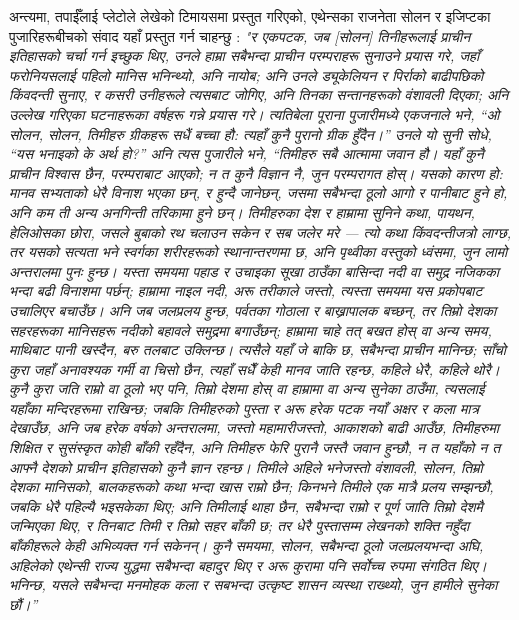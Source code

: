 \documentclass[10pt,twocolumn,letterpaper]{article}
\begin{document}
अन्त्यमा, तपाईँलाई प्लेटोले लेखेको टिमायसमा प्रस्तुत गरिएको, एथेन्सका राजनेता सोलन र इजिप्टका पुजारिहरूबीचको संवाद यहाँ प्रस्तुत गर्न चाहन्छु \cite{140}: \textit{"र एकपटक, जब [सोलन] तिनीहरूलाई प्राचीन इतिहासको चर्चा गर्न इच्छुक थिए, उनले हाम्रा सबैभन्दा प्राचीन परम्पराहरू सुनाउने प्रयास गरे, जहाँ फरोनियसलाई पहिलो मानिस भनिन्थ्यो, अनि नायोब; अनि उनले ड्यूकेलियन र पिर्राको बाढीपछिको किंवदन्ती सुनाए, र कसरी उनीहरूले त्यसबाट जोगिए, अनि तिनका सन्तानहरूको वंशावली दिएका; अनि उल्लेख गरिएका घटनाहरूका वर्षहरू गन्ने प्रयास गरे। त्यतिबेला पूराना पुजारीमध्ये एकजनाले भने, “ओ सोलन, सोलन, तिमीहरु ग्रीकहरू सधैं बच्चा हौ: त्यहाँ कुनै पुरानो ग्रीक हुँदैन।” उनले यो सुनी सोधे, “यस भनाइको के अर्थ हो?” अनि त्यस पुजारीले भने, “तिमीहरु सबै आत्मामा जवान हौ। यहाँ कुनै प्राचीन विश्वास छैन, परम्पराबाट आएको; न त कुनै विज्ञान नै, जुन परम्परागत होस्। यसको कारण हो: मानव सभ्यताको धेरै विनाश भएका छन्, र हुन्दै जानेछन्, जसमा सबैभन्दा ठूलो आगो र पानीबाट हुने हो, अनि कम ती अन्य अनगिन्ती तरिकामा हुने छन्। तिमीहरुका देश र हाम्रामा सुनिने कथा, पायथन, हेलिओसका छोरा, जसले बुबाको रथ चलाउन सकेन र सब जलेर मरे — त्यो कथा किंवदन्तीजत्रो लाग्छ, तर यसको सत्यता भने स्वर्गका शरीरहरूको स्थानान्तरणमा छ, अनि पृथ्वीका वस्तुको ध्वंसमा, जुन लामो अन्तरालमा पुनः हुन्छ। यस्ता समयमा पहाड र उचाइका सूखा ठाउँका बासिन्दा नदी वा समुद्र नजिकका भन्दा बढी विनाशमा पर्छन्; हाम्रामा नाइल नदी, अरू तरीकाले जस्तो, त्यस्ता समयमा यस प्रकोपबाट उचालिएर बचाउँछ। अनि जब जलप्रलय हुन्छ, पर्वतका गोठाला र बाख्रापालक बच्छन्, तर तिम्रो देशका सहरहरूका मानिसहरू नदीको बहावले समुद्रमा बगाउँछन्; हाम्रामा चाहे तत् बखत होस् वा अन्य समय, माथिबाट पानी खस्दैन, बरु तलबाट उक्लिन्छ। त्यसैले यहाँ जे बाकि छ, सबैभन्दा प्राचीन मानिन्छ; साँचो कुरा जहाँ अनावश्यक गर्मी वा चिसो छैन, त्यहाँ सधैँ केही मानव जाति रहन्छ, कहिले धेरै, कहिले थोरै। कुनै कुरा जति राम्रो वा ठूलो भए पनि, तिम्रो देशमा होस् वा हाम्रामा वा अन्य सुनेका ठाउँमा, त्यसलाई यहाँका मन्दिरहरूमा राखिन्छ; जबकि तिमीहरुको पुस्ता र अरू हरेक पटक नयाँ अक्षर र कला मात्र देखाउँछ, अनि जब हरेक वर्षको अन्तरालमा, जस्तो महामारीजस्तो, आकाशको बाढी आउँछ, तिमीहरुमा शिक्षित र सुसंस्कृत कोही बाँकी रहँदैन, अनि तिमीहरु फेरि पुरानै जस्तै जवान हुन्छौ, न त यहाँको न त आफ्नै देशको प्राचीन इतिहासको कुनै ज्ञान रहन्छ। तिमीले अहिले भनेजस्तो वंशावली, सोलन, तिम्रो देशका मानिसको, बालकहरूको कथा भन्दा खास राम्रो छैन; किनभने तिमीले एक मात्रै प्रलय सम्झन्छौ, जबकि धेरै पहिल्यै भइसकेका थिए; अनि तिमीलाई थाहा छैन, सबैभन्दा राम्रो र पूर्ण जाति तिम्रो देशमै जन्मिएका थिए, र तिनबाट तिमी र तिम्रो सहर बाँकी छ; तर धेरै पुस्तासम्म लेखनको शक्ति नहुँदा बाँकीहरूले केही अभिव्यक्त गर्न सकेनन्। कुनै समयमा, सोलन, सबैभन्दा ठूलो जलप्रलयभन्दा अघि, अहिलेको एथेन्सी राज्य युद्धमा सबैभन्दा बहादुर थिए र अरू कुरामा पनि सर्वोच्च रुपमा संगठित थिए। भनिन्छ, यसले सबैभन्दा मनमोहक कला र सबभन्दा उत्कृष्ट शासन व्यस्था राख्थ्यो, जुन हामीले सुनेका छौं।”}
\end{document}
